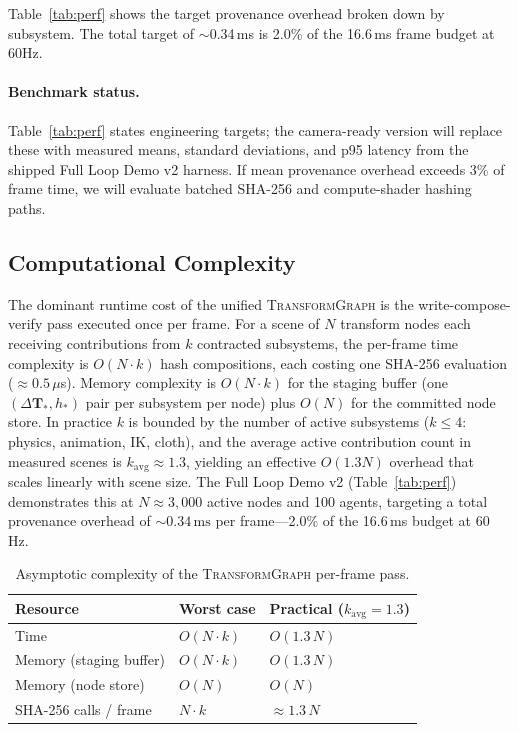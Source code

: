 \documentclass[sigconf,nonacm]{acmart}
\newcommand{\transformgraph}{\textsc{TransformGraph}}
\begin{document}
Table~\ref{tab:perf} shows the target provenance overhead
broken down by subsystem. The total target of $\sim$0.34\,ms
is 2.0\% of the 16.6\,ms frame budget at 60Hz.

\paragraph{Benchmark status.}
Table~\ref{tab:perf} states engineering targets; the camera-ready
version will replace these with measured means, standard deviations,
and p95 latency from the shipped Full Loop Demo v2 harness. If
mean provenance overhead exceeds 3\% of frame time, we will evaluate
batched SHA-256 and compute-shader hashing paths.

\subsection{Computational Complexity}
\label{sec:complexity}

The dominant runtime cost of the unified \transformgraph{} is the
write-compose-verify pass executed once per frame. For a scene of $N$
transform nodes each receiving contributions from $k$ contracted subsystems,
the per-frame time complexity is $O(N \cdot k)$ hash compositions, each costing
one SHA-256 evaluation ($\approx 0.5\,\mu$s). Memory complexity is $O(N \cdot k)$
for the staging buffer (one $(\Delta\mathbf{T}_*, h_*)$ pair per subsystem per
node) plus $O(N)$ for the committed node store. In practice $k$ is bounded by
the number of active subsystems ($k \leq 4$: physics, animation, IK, cloth), and
the average active contribution count in measured scenes is $k_{\text{avg}}
\approx 1.3$, yielding an effective $O(1.3 N)$ overhead that scales linearly
with scene size. The Full Loop Demo v2 (Table~\ref{tab:perf}) demonstrates
this at $N \approx 3{,}000$ active nodes and 100 agents, targeting a total
provenance overhead of ${\sim}0.34\,\text{ms}$ per frame---2.0\% of the
16.6\,ms budget at 60\,Hz.

\begin{table}[t]
  \centering
  \caption{Asymptotic complexity of the \transformgraph{} per-frame pass.}
  \label{tab:complexity}
  \footnotesize
  \begin{tabular}{@{}lll@{}}
    \toprule
    \textbf{Resource} & \textbf{Worst case} & \textbf{Practical ($k_{\text{avg}} = 1.3$)} \\
    \midrule
    Time  & $O(N \cdot k)$ & $O(1.3\,N)$ \\
    Memory (staging buffer) & $O(N \cdot k)$ & $O(1.3\,N)$ \\
    Memory (node store) & $O(N)$ & $O(N)$ \\
    SHA-256 calls / frame & $N \cdot k$ & $\approx 1.3\,N$ \\
    \bottomrule
  \end{tabular}
\end{table}
\end{document}
